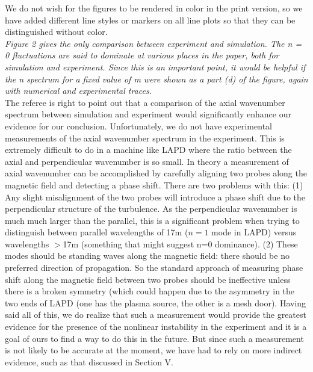 \documentclass[12pt]{article}
\begin{document}
{\noindent We do not wish for the figures to be rendered in color in the print version, so we have added different line styles or markers on all line plots so that they can be 
distinguished without color. }\\

{\noindent \itshape   Figure 2 gives the only comparison between experiment and simulation. The n = 0
fluctuations are said to dominate at various places in the paper, both for simulation and
experiment. Since this is an important point, it would be helpful if the n spectrum for a
fixed value of m were shown as a part (d) of the figure, again with numerical and
experimental traces. }\\

{\noindent The referee is right to point out that a comparison of the axial wavenumber spectrum between simulation and experiment would significantly enhance our evidence for our conclusion.  Unfortunately, we do not have experimental measurements of the axial wavenumber spectrum in the experiment. This is extremely difficult to do in a machine like LAPD where the ratio between the axial and perpendicular wavenumber is so small.  In theory a measurement of axial wavenumber can be accomplished by carefully aligning two probes along the magnetic field and detecting a phase shift.  There are two problems with this: (1) Any slight misalignment of the two probes will introduce a phase shift due to the perpendicular structure of the turbulence.  As the perpendicular wavenumber is much much larger than the parallel, this is a significant problem when trying to distinguish between parallel wavelengths of 17m ($n=1$ mode in LAPD) versus wavelengths $>$17m (something that might suggest n=0 dominance).  (2) These modes should be standing waves along the magnetic field:  there should be no preferred direction of propagation.  So the standard approach of measuring phase shift along the magnetic field between two probes should be ineffective unless there is a broken symmetry (which could happen due to the asymmetry in the two ends of LAPD (one has the plasma source, the other is a mesh door).  Having said all of this, we do realize that such a measurement would provide the greatest
evidence for the presence of the nonlinear instability in the experiment and it is a goal of ours to find a way to do this in the future. 
But since such a measurement is not likely to be accurate at the moment, we have had to rely on more indirect evidence, such as that discussed in Section V. }\\
   
\end{document}
